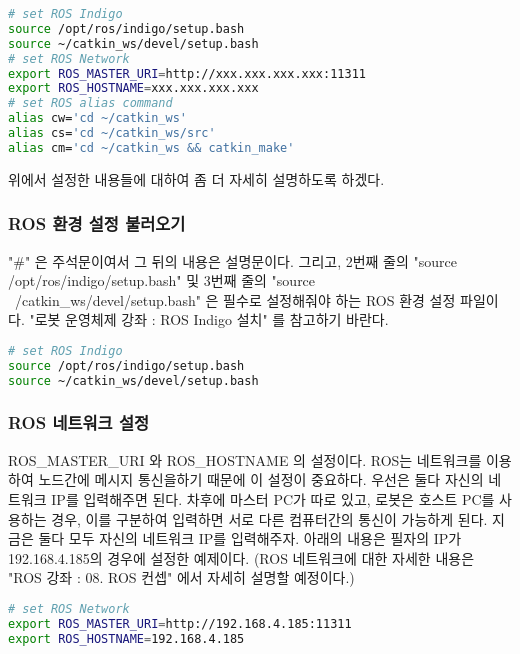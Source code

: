 \begin{lstlisting}[language=bash]
# set ROS Indigo
source /opt/ros/indigo/setup.bash
source ~/catkin_ws/devel/setup.bash
# set ROS Network
export ROS_MASTER_URI=http://xxx.xxx.xxx.xxx:11311
export ROS_HOSTNAME=xxx.xxx.xxx.xxx
# set ROS alias command
alias cw='cd ~/catkin_ws'
alias cs='cd ~/catkin_ws/src'
alias cm='cd ~/catkin_ws && catkin_make'
\end{lstlisting}

위에서 설정한 내용들에 대하여 좀 더 자세히 설명하도록 하겠다.

\subsubsection{ROS 환경 설정 불러오기}
"\#" 은 주석문이여서 그 뒤의 내용은 설명문이다. 그리고,  2번째 줄의 "source /opt/ros/indigo/setup.bash" 및 3번째 줄의 "source ~/catkin\_ws/devel/setup.bash" 은 필수로 설정해줘야 하는 ROS 환경 설정 파일이다. "로봇 운영체제 강좌 : ROS Indigo 설치" 를 참고하기 바란다.

\begin{lstlisting}[language=bash]
# set ROS Indigo
source /opt/ros/indigo/setup.bash
source ~/catkin_ws/devel/setup.bash
\end{lstlisting}

\subsubsection{ROS 네트워크 설정}
ROS\_MASTER\_URI 와 ROS\_HOSTNAME 의 설정이다. ROS는 네트워크를 이용하여 노드간에 메시지 통신을하기 때문에 이 설정이 중요하다. 우선은 둘다 자신의 네트워크 IP를 입력해주면 된다. 차후에 마스터 PC가 따로 있고, 로봇은 호스트 PC를 사용하는 경우, 이를 구분하여 입력하면 서로 다른 컴퓨터간의 통신이 가능하게 된다. 지금은 둘다 모두 자신의 네트워크 IP를 입력해주자. 아래의 내용은 필자의 IP가 192.168.4.185의 경우에 설정한 예제이다. (ROS 네트워크에 대한 자세한 내용은 "ROS 강좌 : 08. ROS 컨셉" 에서 자세히 설명할 예정이다.)

\begin{lstlisting}[language=bash]
# set ROS Network
export ROS_MASTER_URI=http://192.168.4.185:11311
export ROS_HOSTNAME=192.168.4.185
\end{lstlisting}

